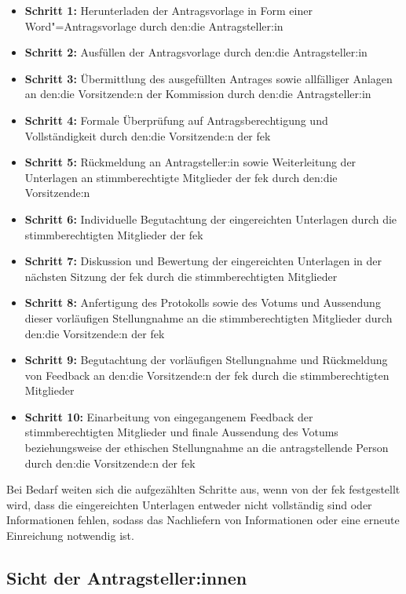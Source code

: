 \documentclass[a4paper,12pt,twoside]{scrreprt}
\begin{document}
\begin{itemize}
    \item \textbf{Schritt 1:} Herunterladen der Antragsvorlage in Form einer Word"=Antragsvorlage durch den:die Antragsteller:in
    \item \textbf{Schritt 2:} Ausfüllen der Antragsvorlage durch den:die Antragsteller:in
    \item \textbf{Schritt 3:} Übermittlung des ausgefüllten Antrages sowie allfälliger Anlagen an den:die Vorsitzende:n der Kommission durch den:die Antragsteller:in
    \item \textbf{Schritt 4:} Formale Überprüfung auf Antragsberechtigung und Vollständigkeit durch den:die Vorsitzende:n der \ac{fek}
    \item \textbf{Schritt 5:} Rückmeldung an Antragsteller:in sowie Weiterleitung der Unterlagen an stimmberechtigte Mitglieder der \ac{fek} durch den:die Vorsitzende:n
    \item \textbf{Schritt 6:} Individuelle Begutachtung der eingereichten Unterlagen durch die stimmberechtigten Mitglieder der \ac{fek}
    \item \textbf{Schritt 7:} Diskussion und Bewertung der eingereichten Unterlagen in der nächsten Sitzung der \ac{fek} durch die stimmberechtigten Mitglieder
    \item \textbf{Schritt 8:} Anfertigung des Protokolls sowie des Votums und Aussendung dieser vorläufigen Stellungnahme an die stimmberechtigten Mitglieder durch den:die Vorsitzende:n der \ac{fek}
    \item \textbf{Schritt 9:} Begutachtung der vorläufigen Stellungnahme und Rückmeldung von Feedback an den:die Vorsitzende:n der \ac{fek} durch die stimmberechtigten Mitglieder
    \item \textbf{Schritt 10:} Einarbeitung von eingegangenem Feedback der stimmberechtigten Mitglieder und finale Aussendung des Votums beziehungsweise der ethischen Stellungnahme an die antragstellende Person durch den:die Vorsitzende:n der \ac{fek}
\end{itemize}

Bei Bedarf weiten sich die aufgezählten Schritte aus, wenn von der \ac{fek} festgestellt wird, dass die eingereichten Unterlagen entweder nicht vollständig sind oder Informationen fehlen, sodass das Nachliefern von Informationen oder eine erneute Einreichung notwendig ist.

\subsection{Sicht der Antragsteller:innen}
\label{sub-sec:ablauf-sicht-Antragsteller}
\end{document}
